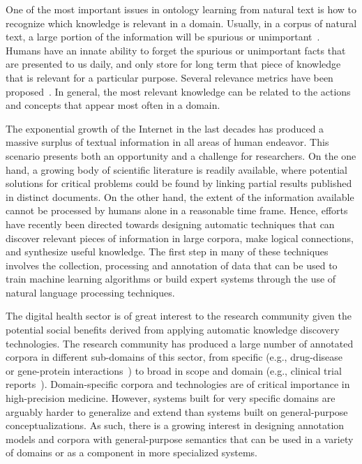 One of the most important issues in ontology learning from natural text is how to recognize which knowledge is relevant in a domain. Usually, in a corpus of natural text, a large portion of the information will be spurious or unimportant~\cite{Kanya2009InformationE}.
Humans have an innate ability to forget the spurious or unimportant facts that are presented to us daily, and only store for long term that piece of knowledge that is relevant for a particular purpose.
Several relevance metrics have been proposed~\cite{manning2008introduction, brank2005survey}.
In general, the most relevant knowledge can be related to the actions and concepts that appear most often in a domain.


The exponential growth of the Internet in the last decades has produced a massive surplus of textual information in all areas of human endeavor. This scenario presents both an opportunity and a challenge for researchers. On the one hand, a growing body of scientific literature is readily available, where potential solutions for critical problems could be found by linking partial results published in distinct documents. On the other hand, the extent of the information available cannot be processed by humans alone in a reasonable time frame. Hence,  efforts have recently been directed towards designing automatic techniques that can discover relevant pieces of information in large corpora, make logical connections, and synthesize useful knowledge.
The first step in many of these techniques involves the collection, processing and annotation of data that can be used to train machine learning algorithms or build expert systems through the use of natural language processing techniques.

The digital health sector is of great interest to the research community given the potential social benefits derived from applying automatic knowledge discovery technologies. The research community has produced a large number of annotated corpora in different sub-domains of this sector, from specific (e.g., drug-disease~\cite{goldberg1996drug} or gene-protein interactions~\cite{tanabe2005genetag}) to broad in scope and domain (e.g., clinical trial reports~\cite{nye2018corpus}).
Domain-specific corpora and technologies are of critical importance in high-precision medicine.
However, systems built for very specific domains are arguably harder to generalize and extend than systems built on general-purpose conceptualizations.
As such, there is a growing interest in designing annotation models and corpora with general-purpose semantics that can be used in a variety of domains or as a component in more specialized systems.

